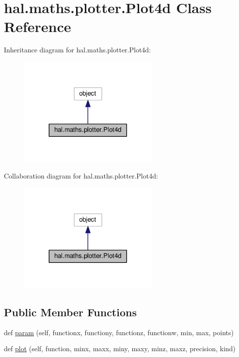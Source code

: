 \hypertarget{classhal_1_1maths_1_1plotter_1_1_plot4d}{}\section{hal.\+maths.\+plotter.\+Plot4d Class Reference}
\label{classhal_1_1maths_1_1plotter_1_1_plot4d}


Inheritance diagram for hal.\+maths.\+plotter.\+Plot4d\+:
\nopagebreak
\begin{figure}[H]
\begin{center}
\leavevmode
\includegraphics[width=200pt]{classhal_1_1maths_1_1plotter_1_1_plot4d__inherit__graph}
\end{center}
\end{figure}


Collaboration diagram for hal.\+maths.\+plotter.\+Plot4d\+:
\nopagebreak
\begin{figure}[H]
\begin{center}
\leavevmode
\includegraphics[width=200pt]{classhal_1_1maths_1_1plotter_1_1_plot4d__coll__graph}
\end{center}
\end{figure}
\subsection*{Public Member Functions}
\begin{DoxyCompactItemize}
\item 
def \hyperlink{classhal_1_1maths_1_1plotter_1_1_plot4d_a90b39427c236100f8c080e08e2222f2d}{param} (self, functionx, functiony, functionz, functionw, min, max, points)
\item 
def \hyperlink{classhal_1_1maths_1_1plotter_1_1_plot4d_aa776ce05b0f159953ea817402aa9e280}{plot} (self, function, minx, maxx, miny, maxy, minz, maxz, precision, kind)
\end{DoxyCompactItemize}

